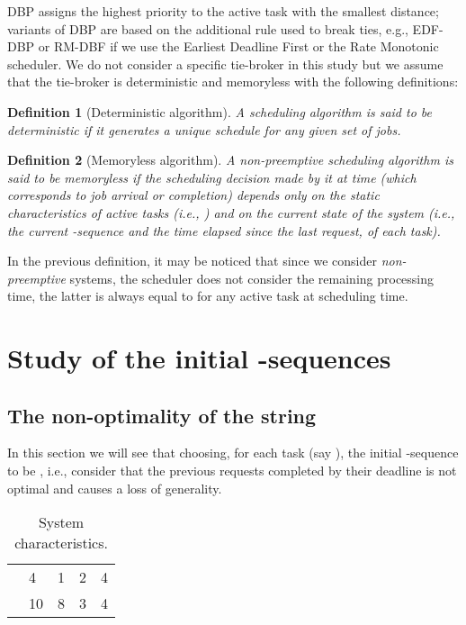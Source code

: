 \documentclass{article}
\newtheorem{Definition}{Definition}
\begin{document}
DBP assigns the highest priority to the active task with the smallest distance; variants of DBP are based on the additional rule used to break ties, e.g., EDF-DBP or RM-DBF if we use the Earliest Deadline First or the Rate Monotonic scheduler. We do not consider a specific tie-broker in this study but we assume that the tie-broker is deterministic and memoryless with the following definitions:

\begin{Definition}[Deterministic algorithm]\label{detAlg} 
A scheduling algorithm is said to
be \emph{deterministic} if it generates a unique schedule for any
given set of jobs.
\end{Definition}

\begin{Definition}[Memoryless algorithm]\label{def:memoryless} 
  A non-preemptive scheduling algorithm is said to be \emph{memoryless} if the
  scheduling decision made by it at time  (which corresponds to job arrival or completion) depends only on the static characteristics of active tasks (i.e., ) and on the current state of the system (i.e., the current -sequence and the time elapsed since the last request, of each task).
\end{Definition}

In the previous definition, it may be noticed that since we consider \emph{non-preemptive} systems, the scheduler does not consider the remaining processing time, the latter is always equal to  for any active task  at scheduling time.

\section{Study of the initial -sequences}\label{sec:counterexample}
\subsection{The non-optimality of the string }

In this section we will see that choosing, for each task (say ), the initial -sequence to be , i.e., consider that the  previous requests completed by their deadline is not optimal and causes a loss of generality.

\begin{table}
\begin{center}
\begin{tabular}{|lllll|}
\hline
&  &  &  & \\
\hline
 & 4 & 1 & 2 & 4\\
 & 10 & 8 & 3 & 4\\
\hline
\end{tabular}
\end{center}
\caption{System characteristics.\label{table:example1}}
\end{table}
\end{document}
